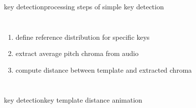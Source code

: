         \begin{frame}{key detection}{processing steps of simple key detection}
            \begin{columns}
                    \begin{enumerate}
                        \item<1->	define reference distribution for specific keys
                        \item<2->	extract average pitch chroma from audio
                        \item<3->	compute distance between template and extracted chroma
                    \end{enumerate}
            \end{columns}
        \end{frame}
        \begin{frame}{key detection}{key template distance animation}
        \end{frame}
        
